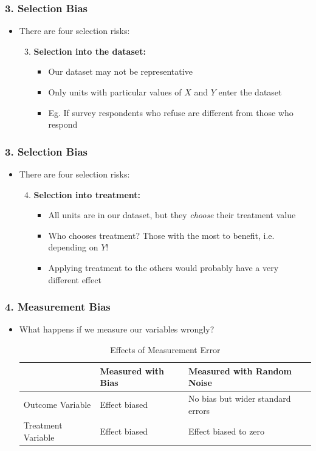 \documentclass[xcolor=x11names,compress]{beamer}\usepackage[]{graphicx}\usepackage[]{color}
\renewcommand{\(}{\begin{columns}}
\renewcommand{\)}{\end{columns}}
\newcommand{\<}[1]{\begin{column}{#1}}
\renewcommand{\>}{\end{column}}
\begin{document}
\begin{frame}
\frametitle{3. Selection Bias}
\begin{itemize}
\item There are four selection risks:
\begin{enumerate}
\setcounter{enumi}{2}
\item \textbf{Selection into the dataset:}
\begin{itemize}
\item Our dataset may not be representative
\item Only units with particular values of $X$ and $Y$ enter the dataset
\item Eg. If survey respondents who refuse are different from those who respond
\end{itemize}
\end{enumerate}
\end{itemize}
\end{frame}

\begin{frame}
\frametitle{3. Selection Bias}
\begin{itemize}
\item There are four selection risks:
\begin{enumerate}
\setcounter{enumi}{3}
\item \textbf{Selection into treatment:}
\begin{itemize}
\item All units are in our dataset, but they \textit{choose} their treatment value
\item Who chooses treatment? Those with the most to benefit, i.e. depending on $Y$!
\item Applying treatment to the others would probably have a very different effect
\end{itemize}
\end{enumerate}
\end{itemize}
\end{frame}

\begin{frame}
\frametitle{4. Measurement Bias}
\begin{itemize}
\item What happens if we measure our variables wrongly?
\footnotesize
\begin{table}[htbp]
  \centering
  \caption{Effects of Measurement Error}
    \begin{tabular}{|l|l|p{4cm}|}
    \hline
          & Measured with Bias & Measured with Random Noise \bigstrut\\
    \hline
    Outcome Variable & Effect biased & No bias but wider standard errors \bigstrut\\
    \hline
    Treatment Variable & Effect biased & Effect biased to zero \bigstrut\\
    \hline
    \end{tabular}%
  \label{tab:addlabel}%
\end{table}%
\normalsize
\end{itemize}
\end{frame}
\end{document}
